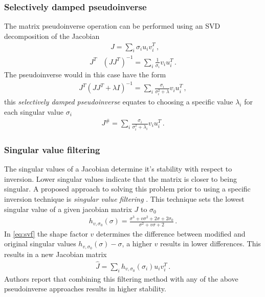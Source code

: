 \documentclass[times, utf8, diplomski, english]{fer}
\begin{document}
\subsubsection{Selectively damped pseudoinverse}
The matrix pseudoinverse operation can be performed using an SVD decomposition of the Jacobian
\begin{align}
& \ \ \ \ \ J = \sum\limits_{i}{\sigma_{i}u_iv_i^T}\, , \\
J^T&\left(JJ^T\right)^{-1} = \sum\limits_{i}{\frac{1}{\sigma_{i}}v_iu_i^T}\, .
\end{align}
The pseudoinverse would in this case have the form 
\begin{align}
J^T\left(JJ^T + \lambda I\right)^{-1} = \sum\limits_{i}{\frac{\sigma_{i}}{\sigma_{i}^2 + \lambda}v_iu_i^T}\, ,
\end{align}
this \textit{selectively damped pseudoinverse} \citep{buss2005selectively} equates to choosing a specific value $\lambda_i$ for each singular value $\sigma_i$
\begin{align}\label{eq:sdp}
J^{\#} = \sum\limits_{i}{\frac{\sigma_{i}}{\sigma_{i}^2 + \lambda_i}v_iu_i^T}\, .
\end{align}
\subsubsection{Singular value filtering}
The singular values of a Jacobian determine it's stability with respect to inversion.
Lower singular values indicate that the matrix is closer to being singular.
A proposed approach to solving this problem prior to using a specific inversion technique is \textit{singular value filtering} \citep{colome2012redundant}. 
This technique sets the lowest singular value of a given jacobian matrix $J$ to $\sigma_0$
\begin{align}\label{eq:svf}
h_{v,\sigma_0}\left(\sigma\right) = \frac{\sigma^3 + v\sigma^2 + 2\sigma + 2\sigma_0}{\sigma^2 + v\sigma + 2}\,.
\end{align}
In \eqref{eq:svf} the shape factor $v$ determines the difference between modified and original singular values $h_{v,\sigma_0}(\sigma)-\sigma$, a higher $v$ results in lower differences. 
This results in a new Jacobian matrix
\begin{align} \label{eq:svf jacobian}
\hat{J}= \sum\limits_{i}{h_{v,\sigma_0}(\sigma_i)u_iv_i^T}\, .
\end{align}
Authors report that combining this filtering method with any of the above pseudoinverse approaches results in higher stability.
\end{document}
